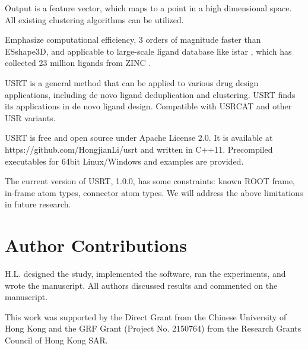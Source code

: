 \documentclass[twocolumn]{svjour3}          %
\begin{document}
Output is a feature vector, which maps to a point in a high dimensional space. All existing clustering algorithms can be utilized.

Emphasize computational efficiency, 3 orders of magnitude faster than ESshape3D, and applicable to large-scale ligand database like istar \cite{1362}, which has collected 23 million ligands from ZINC \cite{532,1178}.

USRT is a general method that can be applied to various drug design applications, including de novo ligand deduplication and clustering. USRT finds its applications in de novo ligand design. Compatible with USRCAT \cite{1331} and other USR variants.

USRT is free and open source under Apache License 2.0. It is available at https://github.com/HongjianLi/usrt and written in C++11. Precompiled executables for 64bit Linux/Windows and examples are provided.

The current version of USRT, 1.0.0, has some constraints: known ROOT frame, in-frame atom types, connector atom types. We will address the above limitations in future research.

\section{Author Contributions}

H.L. designed the study, implemented the software, ran the experiments, and wrote the manuscript. All authors discussed results and commented on the manuscript.

\begin{acknowledgements}

This work was supported by the Direct Grant from the Chinese University of Hong Kong and the GRF Grant (Project No. 2150764) from the Research Grants Council of Hong Kong SAR.

\end{acknowledgements}

\end{document}
